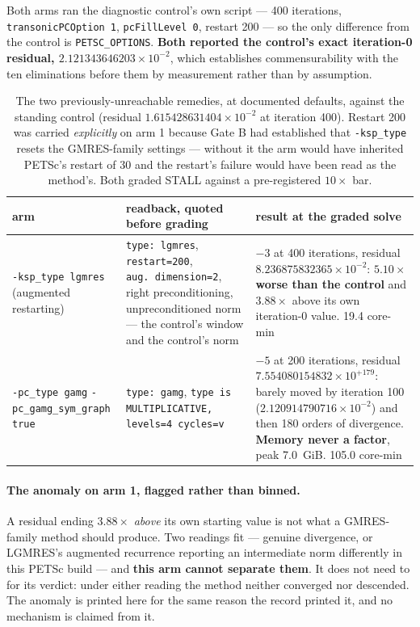 \documentclass[11pt,a4paper]{article}
\begin{document}
Both arms ran the diagnostic control's own script --- 400 iterations,
\texttt{transonicPCOption 1}, \texttt{pcFillLevel 0}, restart 200 --- so the only difference from
the control is \texttt{PETSC\_OPTIONS}. \textbf{Both reported the control's exact iteration-0
residual, \(2.121343646203\times10^{-2}\)}, which establishes commensurability with the ten
eliminations before them by measurement rather than by assumption.

\begin{table}[htbp]
\centering\footnotesize
\begin{tabular}{@{}L{3.0cm}L{5.0cm}L{6.4cm}@{}}
\toprule
arm & readback, quoted before grading & result at the graded solve \\
\midrule
\texttt{-ksp\_type lgmres} (augmented restarting) & \texttt{type: lgmres}, \texttt{restart=200}, \texttt{aug.\ dimension=2}, right preconditioning, unpreconditioned norm --- the control's window and the control's norm & \(-3\) at 400 iterations, residual \(8.236875832365\times10^{-2}\): \(\mathbf{5.10\times}\) \textbf{worse than the control} and \(3.88\times\) above its own iteration-0 value. 19.4 core-min \\
\addlinespace
\texttt{-pc\_type gamg} \texttt{-pc\_gamg\_sym\_graph true} & \texttt{type: gamg}, \texttt{type is MULTIPLICATIVE, levels=4 cycles=v} & \(-5\) at 200 iterations, residual \(7.554080154832\times10^{+179}\): barely moved by iteration 100 (\(2.120914790716\times10^{-2}\)) and then 180 orders of divergence. \textbf{Memory never a factor}, peak 7.0~GiB. 105.0 core-min \\
\bottomrule
\end{tabular}
\caption{The two previously-unreachable remedies, at documented defaults, against the standing
control (residual \(1.615428631404\times10^{-2}\) at iteration 400). Restart 200 was carried
\emph{explicitly} on arm 1 because Gate B had established that \texttt{-ksp\_type} resets the
GMRES-family settings --- without it the arm would have inherited PETSc's restart of 30 and the
restart's failure would have been read as the method's. Both graded STALL against a
pre-registered \(10\times\) bar.}
\label{tab:stage2}
\end{table}

\paragraph{The anomaly on arm 1, flagged rather than binned.} A residual ending \(3.88\times\)
\emph{above} its own starting value is not what a GMRES-family method should produce. Two readings
fit --- genuine divergence, or LGMRES's augmented recurrence reporting an intermediate norm
differently in this PETSc build --- and \textbf{this arm cannot separate them}. It does not need
to for its verdict: under either reading the method neither converged nor descended. The anomaly
is printed here for the same reason the record printed it, and no mechanism is claimed from it.
\end{document}
